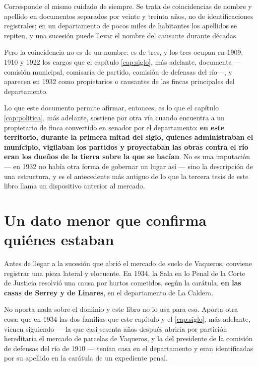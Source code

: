 \begin{cautela}
Corresponde el mismo cuidado de siempre. Se trata de coincidencias de nombre y apellido en
documentos separados por veinte y treinta años, no de identificaciones registrales; en un
departamento de pocos miles de habitantes los apellidos se repiten, y una sucesión
puede llevar el nombre del causante durante décadas.

Pero la coincidencia no es de un nombre: es de tres, y los tres ocupan en 1909, 1910 y 1922
los cargos que el capítulo \ref{cap:siglo}, más adelante, documenta —comisión municipal, comisaría de partido, comisión
de defensas del río—, y aparecen en 1932 como propietarios o causantes de las fincas
principales del departamento.

Lo que este documento permite afirmar, entonces, es lo que el capítulo \ref{cap:politica}, más adelante, sostiene por otra
vía cuando encuentra a un propietario de finca convertido en senador por el departamento:
\textbf{en este territorio, durante la primera mitad del siglo, quienes administraban el
municipio, vigilaban los partidos y proyectaban las obras contra el río eran los dueños de
la tierra sobre la que se hacían}. No es una imputación --- en 1932 no había otra forma de
gobernar un lugar así --- sino la descripción de una estructura, y es el antecedente más
antiguo de lo que la tercera tesis de este libro llama un dispositivo anterior al mercado.
\end{cautela}

\section{Un dato menor que confirma quiénes estaban}

Antes de llegar a la sucesión que abrió el mercado de suelo de Vaqueros, conviene registrar
una pieza lateral y elocuente. En 1934, la Sala en lo Penal de la Corte de Justicia resolvió
una causa por hurtos cometidos, según la carátula, \textbf{en las casas de Serrey y de
Linares}, en el departamento de La Caldera.

No aporta nada sobre el dominio y este libro no lo usa para eso. Aporta otra cosa: que en
1934 las dos familias que este capítulo y el \ref{cap:siglo}, más adelante, vienen siguiendo --- la que casi sesenta años después abriría por partición hereditaria el mercado de parcelas de Vaqueros, y la del
presidente de la comisión de defensas del río de 1910 --- tenían casa en el departamento y
eran identificadas por su apellido en la carátula de un expediente penal.

